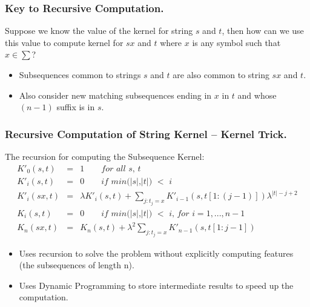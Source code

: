 \documentclass[10pt]{beamer}
\begin{document}
\begin{frame}
	\frametitle{Key to Recursive Computation.}
	Suppose we know the value of the kernel for string $s$ and $t$, then how can we use this value to compute kernel for $sx$ and $t$
	where $x$ is any symbol such that $x \in \sum$?
	\begin{itemize}
		\item Subsequences common to strings $s$ and $t$ are also common to string $sx$ and $t$.
		\item Also consider new matching subsequences ending in $x$ in $t$ and whose $(n-1)$ suffix is in $s$.
	\end{itemize}
\end{frame}

\begin{frame}
	\frametitle{Recursive Computation of String Kernel -- Kernel Trick.}
	The recursion for computing the Subsequence Kernel:
	\centering
	\begin{eqnarray}
	K'_0(s,t) & = & 1 \qquad  \textit{for all s, t} \label{one}\\
	K'_i(s,t) & = & 0 \qquad \textit{if min($|s|$,$|t|$) $<$ i} \label{two}  \\
	K'_i(sx,t) & = & \lambda K'_i(s,t) + \sum_{j:t_j=x}K'_{i-1}(s,t[1:(j-1)]) \lambda^{|t|-j+2} \label{three}  \\
	K_i(s,t) & = & 0 \qquad \textit{if min($|s|$,$|t|$) $<$ i, for $i = 1,...,n-1$} \label{four} \\
	K_n(sx,t) & = & K_n(s,t) + \lambda^2 \sum_{j:t_j=x}K'_{n-1}(s,t[1:j-1])\label{five} 
	\end{eqnarray}
	\centering

	\begin{itemize}
		\item Uses recursion to solve the problem without explicitly computing features (the subsequences of length n).
		\item Uses Dynamic Programming to store intermediate results to speed up the computation.
	\end{itemize}
\end{frame}
\end{document}
